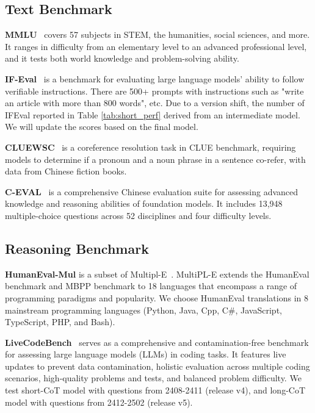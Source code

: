 \documentclass{article}
\newcommand{\citep}[1]{\parencite{#1}}
\begin{document}
\subsection{Text Benchmark}

\textbf{MMLU}~\citep{Hendrycks2020MeasuringMM} covers 57 subjects in STEM, the humanities, social sciences, and more. It ranges in difficulty from an elementary level to an advanced professional level, and it tests both world knowledge and problem-solving ability.

\textbf{IF-Eval}~\citep{Zhou2023InstructionFollowingEF} is a benchmark for evaluating large language models' ability to follow verifiable instructions. There are 500+ prompts with instructions such as "write an article with more than 800 words", etc.
Due to a version shift, the number of IFEval reported in Table \ref{tab:short_perf} derived from an intermediate model. We will update the scores based on the final model.

\textbf{CLUEWSC}~\citep{Xu2020CLUEAC} is a coreference resolution task in CLUE benchmark, requiring models to determine if a pronoun and a noun phrase in a sentence co-refer, with data from Chinese fiction books.

\textbf{C-EVAL}~\citep{Huang2023CEvalAM} is a comprehensive Chinese evaluation suite for assessing advanced knowledge and reasoning abilities of foundation models. It includes 13,948 multiple-choice questions across 52 disciplines and four difficulty levels.

\subsection{Reasoning Benchmark}

\textbf{HumanEval-Mul} is a subset of Multipl-E~\citep{Cassano2022MultiPLEAS}. MultiPL-E extends the HumanEval benchmark and MBPP benchmark to 18 languages that encompass a range of programming paradigms and popularity. We choose HumanEval translations in 8 mainstream programming languages (Python, Java, Cpp, C\#, JavaScript, TypeScript, PHP, and Bash).

\textbf{LiveCodeBench}~\citep{Jain2024LiveCodeBenchHA} serves as a comprehensive and contamination-free benchmark for assessing large language models (LLMs) in coding tasks.  It features live updates to prevent data contamination, holistic evaluation across multiple coding scenarios, high-quality problems and tests, and balanced problem difficulty. We test short-CoT model with questions from 2408-2411 (release v4), and long-CoT model with questions from 2412-2502 (release v5).
\end{document}
